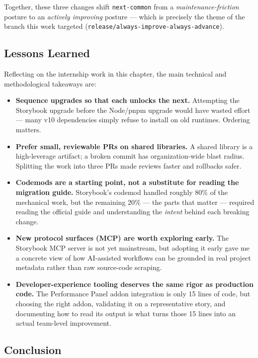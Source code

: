 Together, these three changes shift \texttt{next-common} from a \emph{maintenance-friction} posture to an \emph{actively improving} posture --- which is precisely the theme of the branch this work targeted (\texttt{release/always-improve-always-advance}).

\subsection{Lessons Learned}

Reflecting on the internship work in this chapter, the main technical and methodological takeaways are:

\begin{itemize}
    \item \textbf{Sequence upgrades so that each unlocks the next.} Attempting the Storybook upgrade before the Node/pnpm upgrade would have wasted effort --- many v10 dependencies simply refuse to install on old runtimes. Ordering matters.
    \item \textbf{Prefer small, reviewable PRs on shared libraries.} A shared library is a high-leverage artifact; a broken commit has organization-wide blast radius. Splitting the work into three PRs made reviews faster and rollbacks safer.
    \item \textbf{Codemods are a starting point, not a substitute for reading the migration guide.} Storybook's codemod handled roughly 80\% of the mechanical work, but the remaining 20\% --- the parts that matter --- required reading the official guide and understanding the \emph{intent} behind each breaking change.
    \item \textbf{New protocol surfaces (MCP) are worth exploring early.} The Storybook MCP server is not yet mainstream, but adopting it early gave me a concrete view of how AI-assisted workflows can be grounded in real project metadata rather than raw source-code scraping.
    \item \textbf{Developer-experience tooling deserves the same rigor as production code.} The Performance Panel addon integration is only 15 lines of code, but choosing the right addon, validating it on a representative story, and documenting how to read its output is what turns those 15 lines into an actual team-level improvement.
\end{itemize}

\subsection{Conclusion}

